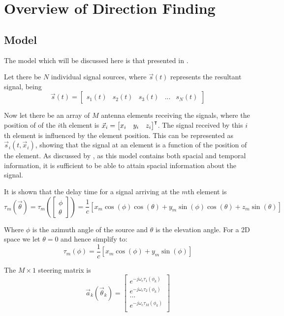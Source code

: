 \section{Overview of Direction Finding}

\subsection{Model}
The model which will be discussed here is that presented in \cite{poisel2012electronic}.  

Let there be $N$ individual signal sources, where $\vec{s}(t)$ represents the resultant signal, being
\begin{equation}
\vec{s}(t) = \begin{bmatrix} s_{1}(t) & s_{2}(t) & s_3(t) & ... & s_N(t) \end{bmatrix}
\end{equation}

Now let there be an array of $M$ antenna elements receiving the signals, where the position of of the \(i\)th element is \(\vec{x}_{i} = \begin{bmatrix}x_i & y_i & z_i \end{bmatrix}^\intercal\). 
The signal received by this \(i\)th element is influenced by the element position. 
This can be represented as \(\vec{s}_i(t, \vec{x}_i)\), showing that the signal at an element is a function of the position of the element.
As discussed by \cite{krim1996two}, as this model contains both spacial and temporal information, it is sufficient to be able to attain spacial information about the signal. 

It is shown that the delay time for a signal arriving at the \(m\)th element is
\begin{equation}
  \tau_m(\vec{\theta}) 
 = \tau_m( \begin{bmatrix} \phi \\ \theta \end{bmatrix} )
  = \frac{1}{c} [ x_m\cos(\phi)\cos(\theta) + y_m\sin(\phi)\cos(\theta) + z_m\sin(\theta) ]
\end{equation}

Where \(\phi\) is the azimuth angle of the source and \(\theta\) is the elevation angle.
For a 2D space we let \(\theta = 0\) and hence simplify to:
\begin{equation}
 \tau_m(\phi) = \frac{1}{c} [ x_m\cos(\phi) + y_m\sin(\phi) ]
\end{equation}

The \(M \times 1\) steering matrix is
\begin{equation}
  \vec{a}_k(\vec{\theta}_k) = 
  \begin{bmatrix}
    e^{-j\omega_c \tau_1(\phi_k)} \\
    e^{-j\omega_c \tau_2(\phi_k)} \\
    ... \\
    e^{-j\omega_c \tau_M(\phi_k)} \\
  \end{bmatrix}
\end{equation}

